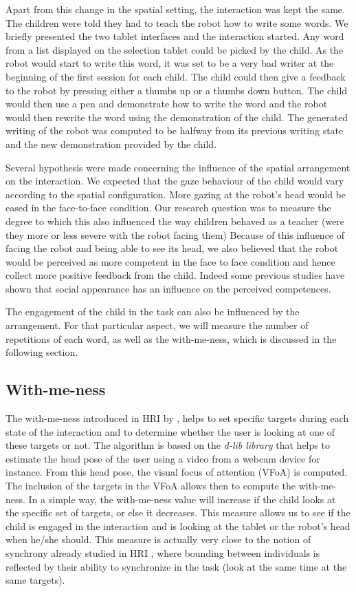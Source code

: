 \documentclass[letterpaper, 10 pt, conference]{ieeeconf}  %
\begin{document}
Apart from this change in the spatial setting, the interaction was kept the same. 
The children were told they had to teach the robot how to write some words. 
We briefly presented the two tablet interfaces and the interaction started.
Any word from a list displayed on the selection tablet could be picked by the child.
As the robot would start to write this word, it was set to be a very bad writer at the beginning of the first session for each child.
The child could then give a feedback to the robot by pressing either a thumbs up or a thumbs down button.
The child would then use a pen and demonstrate how to write the word and the robot would then rewrite the word using the demonstration of the child.
The generated writing of the robot was computed to be halfway from its previous writing state and the new demonstration provided by the child.

Several hypothesis were made concerning the influence of the spatial arrangement on the interaction.
We expected that the gaze behaviour of the child would vary according to the spatial configuration.
More gazing at the robot's head would be eased in the face-to-face condition.
Our research question was to measure the degree to which this also influenced the way children behaved as a teacher (were they more or less severe with the robot facing them)
Because of this influence of facing the robot and being able to see its head, we also believed that the robot would be perceived as more competent in the face to face condition and hence collect more positive feedback from the child.
Indeed some previous studies have shown that social appearance \cite{goetz2003matching} has an influence on the perceived competences.

The engagement of the child in the task can also be influenced by the arrangement.
For that particular aspect, we will measure the number of repetitions of each word, as well as the with-me-ness, which is discussed in the following section.



\subsection{With-me-ness}
The with-me-ness introduced in HRI by \cite{lemaignan2016realtime}, helps to set specific targets during each state of the interaction and to determine whether the user is looking at one of these targets or not.
The algorithm is based on the \textit{d-lib library} that helps to estimate the head pose of the user using a video from a webcam device for instance.
From this head pose, the visual focus of attention (VFoA) is computed.
The inclusion of the targets in the VFoA allows then to compute the with-me-ness.
In a simple way, the with-me-ness value will increase if the child looks at the specific set of targets, or else it decreases.
This measure allows us to see if the child is engaged in the interaction and is looking at the tablet or the robot's head when he/she should.
This measure is actually very close to the notion of synchrony already studied in HRI \cite{delaherche2012interpersonal}, where bounding between individuals is reflected by their ability to synchronize in the task (look at the same time at the same targets).
\end{document}
